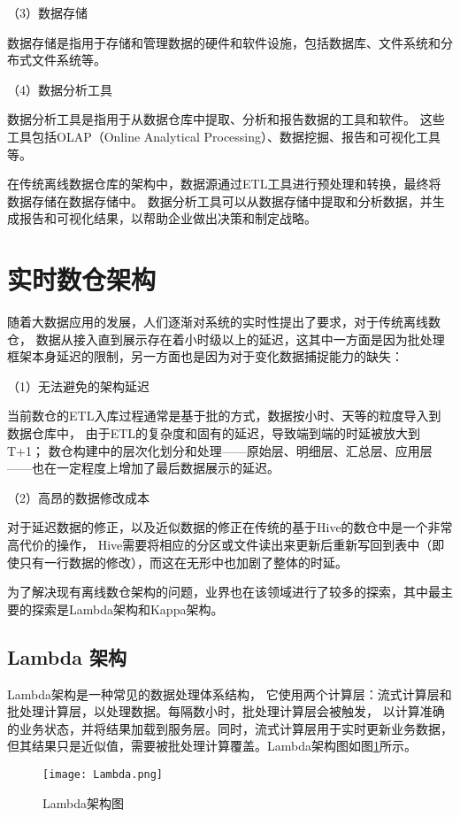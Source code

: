 （3）数据存储

数据存储是指用于存储和管理数据的硬件和软件设施，包括数据库、文件系统和分布式文件系统等。

（4）数据分析工具

数据分析工具是指用于从数据仓库中提取、分析和报告数据的工具和软件。
这些工具包括OLAP（Online Analytical Processing）、数据挖掘、报告和可视化工具等。

在传统离线数据仓库的架构中，数据源通过ETL工具进行预处理和转换，最终将数据存储在数据存储中。
数据分析工具可以从数据存储中提取和分析数据，并生成报告和可视化结果，以帮助企业做出决策和制定战略。

\section{实时数仓架构}

随着大数据应用的发展，人们逐渐对系统的实时性提出了要求，对于传统离线数仓，
数据从接入直到展示存在着小时级以上的延迟\cite{25}，这其中一方面是因为批处理框架本身延迟的限制，另一方面也是因为对于变化数据捕捉能力的缺失：

（1）无法避免的架构延迟

当前数仓的ETL入库过程通常是基于批的方式，数据按小时、天等的粒度导入到数据仓库中，
由于ETL的复杂度和固有的延迟，导致端到端的时延被放大到T+1；
数仓构建中的层次化划分和处理——原始层、明细层、汇总层、应用层——也在一定程度上增加了最后数据展示的延迟。

（2）高昂的数据修改成本

对于延迟数据的修正，以及近似数据的修正在传统的基于Hive的数仓中是一个非常高代价的操作，
Hive需要将相应的分区或文件读出来更新后重新写回到表中（即使只有一行数据的修改），而这在无形中也加剧了整体的时延。

为了解决现有离线数仓架构的问题，业界也在该领域进行了较多的探索，其中最主要的探索是Lambda架构和Kappa架构。

\subsection{Lambda 架构}

Lambda架构是一种常见的数据处理体系结构，
它使用两个计算层：流式计算层和批处理计算层，以处理数据。每隔数小时，批处理计算层会被触发，
以计算准确的业务状态，并将结果加载到服务层。同时，流式计算层用于实时更新业务数据，
但其结果只是近似值，需要被批处理计算覆盖\cite{3}。Lambda架构图如图\ref{fig:Lambda架构图}所示。

\begin{figure}[H]
  \centering
  \texttt{[image: Lambda.png]}
  \caption{Lambda架构图}
  \label{fig:Lambda架构图}
\end{figure}

